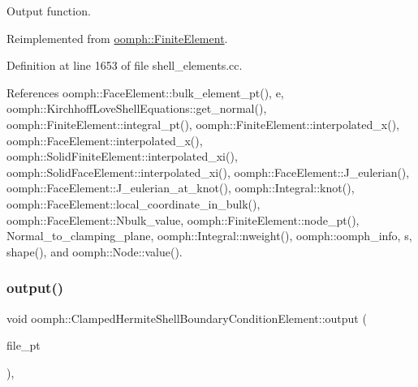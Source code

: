 Output function. 



Reimplemented from \hyperlink{classoomph_1_1FiniteElement_afa9d9b2670f999b43e6679c9dd28c457}{oomph\+::\+Finite\+Element}.



Definition at line 1653 of file shell\+\_\+elements.\+cc.



References oomph\+::\+Face\+Element\+::bulk\+\_\+element\+\_\+pt(), e, oomph\+::\+Kirchhoff\+Love\+Shell\+Equations\+::get\+\_\+normal(), oomph\+::\+Finite\+Element\+::integral\+\_\+pt(), oomph\+::\+Finite\+Element\+::interpolated\+\_\+x(), oomph\+::\+Face\+Element\+::interpolated\+\_\+x(), oomph\+::\+Solid\+Finite\+Element\+::interpolated\+\_\+xi(), oomph\+::\+Solid\+Face\+Element\+::interpolated\+\_\+xi(), oomph\+::\+Face\+Element\+::\+J\+\_\+eulerian(), oomph\+::\+Face\+Element\+::\+J\+\_\+eulerian\+\_\+at\+\_\+knot(), oomph\+::\+Integral\+::knot(), oomph\+::\+Face\+Element\+::local\+\_\+coordinate\+\_\+in\+\_\+bulk(), oomph\+::\+Face\+Element\+::\+Nbulk\+\_\+value, oomph\+::\+Finite\+Element\+::node\+\_\+pt(), Normal\+\_\+to\+\_\+clamping\+\_\+plane, oomph\+::\+Integral\+::nweight(), oomph\+::oomph\+\_\+info, s, shape(), and oomph\+::\+Node\+::value().

\mbox{\label{classoomph_1_1ClampedHermiteShellBoundaryConditionElement_af1b8f1785d656386e36a01336611a22d}} 
\subsubsection{\texorpdfstring{output()}{output()}\hspace{0.1cm}{\footnotesize\ttfamily [3/4]}}
{\footnotesize\ttfamily void oomph\+::\+Clamped\+Hermite\+Shell\+Boundary\+Condition\+Element\+::output (\begin{DoxyParamCaption}\item[{F\+I\+LE $\ast$}]{file\+\_\+pt }\end{DoxyParamCaption})\hspace{0.3cm}{\ttfamily [inline]}, {\ttfamily [virtual]}}

